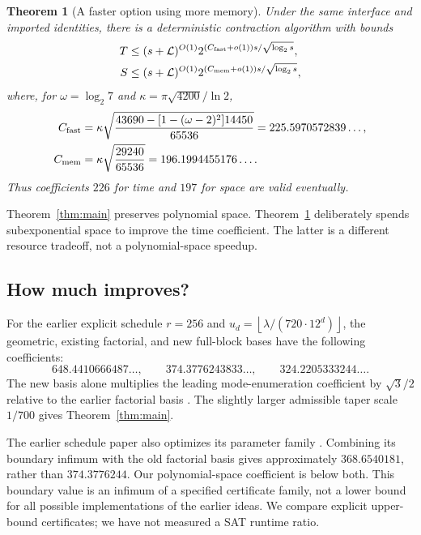 \documentclass[11pt,letterpaper]{article}
\newtheorem{theorem}{Theorem}[section]
\theoremstyle{definition}\newtheorem{definition}[theorem]{Definition}
\theoremstyle{remark}\newtheorem{remark}[theorem]{Remark}
\newcommand{\floor}[1]{\left\lfloor#1\right\rfloor}
\begin{document}
\begin{theorem}[A faster option using more memory]\label{thm:fast}
Under the same interface and imported identities, there is a deterministic
contraction algorithm with bounds
\begin{align*}
 T&\le(s+\mathcal L)^{O(1)}
   2^{(C_{\rm fast}+o(1))s/\sqrt{\log_2s}},\\
 S&\le(s+\mathcal L)^{O(1)}
   2^{(C_{\rm mem}+o(1))s/\sqrt{\log_2s}},
\end{align*}
where, for $\omega=\log_2 7$ and $\kappa=\pi\sqrt{4200}/\ln2$,
\begin{align*}
 C_{\rm fast}
 &=\kappa\sqrt{\frac{43690-[1-(\omega-2)^2]14450}{65536}}
   =225.5970572839\ldots,\\
 C_{\rm mem}
 &=\kappa\sqrt{\frac{29240}{65536}}
   =196.1994455176\ldots .
\end{align*}
Thus coefficients $226$ for time and $197$ for space are valid eventually.
\end{theorem}

Theorem~\ref{thm:main} preserves polynomial space.
Theorem~\ref{thm:fast} deliberately spends subexponential space to improve
the time coefficient. The latter is a different resource tradeoff, not a
polynomial-space speedup.

\subsection{How much improves?}

For the earlier explicit schedule $r=256$ and
$u_d=\floor{\lambda/(720\cdot12^d)}$, the geometric, existing factorial,
and new full-block bases have the following coefficients:
\[
 648.4410666487\ldots,\qquad
 374.3776243833\ldots,\qquad
 324.2205333244\ldots .
\]
The new basis alone multiplies the leading mode-enumeration coefficient by
$\sqrt3/2$ relative to the earlier factorial basis \cite{factorial}. The slightly larger
admissible taper scale $1/700$ gives Theorem~\ref{thm:main}.

The earlier schedule paper also optimizes its parameter family
\cite{schedule}. Combining its boundary infimum with the old factorial
basis gives approximately $368.6540181$, rather than $374.3776244$.
Our polynomial-space coefficient is below both. This boundary value is an
infimum of a specified certificate family, not a lower bound for all possible
implementations of the earlier ideas. We compare explicit upper-bound
certificates; we have not measured a SAT runtime ratio.
\end{document}
